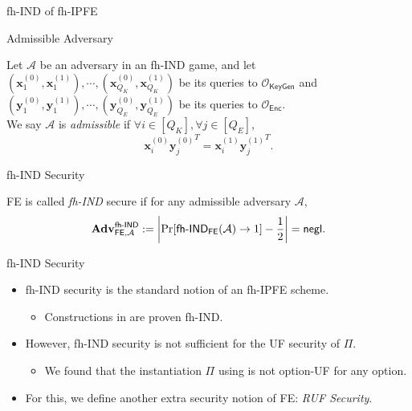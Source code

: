 \begin{frame}{fh-IND of fh-IPFE}

\begin{definition}{Admissible Adversary}

	Let $\mathcal{A}$ be an adversary in an \textsf{fh-IND} game, and let $ (\mathbf{x}_1^{(0)}, \mathbf{x}_1^{(1)}), \cdots, (\mathbf{x}_{Q_K}^{(0)}, \mathbf{x}_{Q_K}^{(1)})$ be its queries to $\mathcal{O}_{\textsf{KeyGen}}$ and $(\mathbf{y}_1^{(0)}, \mathbf{y}_1^{(1)}), \cdots, (\mathbf{y}_{Q_E}^{(0)}, \mathbf{y}_{Q_E}^{(1)})$ be its queries to $\mathcal{O}_{\textsf{Enc}}$.\pause \\
	\medskip
	We say $\mathcal{A}$ is \emph{admissible} if $\forall i \in [Q_K], \forall j \in [Q_E]$,
\[
	{\mathbf{x}^{(0)}_{i}} {\mathbf{y}^{(0)}_{j}}^T = {\mathbf{x}^{(1)}_{i}} {\mathbf{y}^{(1)}_{j}}^T.
\]

\end{definition}
\pause

\begin{definition}{fh-IND Security}

	\textsf{FE} is called \emph{fh-IND} secure if for any admissible adversary $\mathcal{A}$, 
	\[
		\mathbf{Adv}_{\textsf{FE}, \mathcal{A}}^{\textsf{fh-IND}} := \left| \Pr[\textsf{fh-IND}_{\textsf{FE}}(\mathcal{A}) \to 1 ] - \frac{1}{2} \right| = \mathsf{negl}.
	\]

\end{definition}

\end{frame}


\begin{frame}{fh-IND Security}

\begin{itemize}
	
	\item<1-> fh-IND security is the standard notion of an fh-IPFE scheme.
	\begin{itemize}
		\item Constructions in \cite{cryptoeprint:2015/1255, 10.1007/978-3-319-45871-7_24, cryptoeprint:2016/440} are proven fh-IND.
	\end{itemize}

	\item<2-> However, fh-IND security is not sufficient for the UF security of $\Pi$.
	\begin{itemize}
		\item We found that the instantiation $\Pi$ using \cite{cryptoeprint:2016/440} is not \textsf{option}-UF for any \textsf{option}.
	\end{itemize}

	\item<3-> For this, we define another extra security notion of \textsf{FE}: \emph{RUF Security}.

\end{itemize}

\end{frame}


